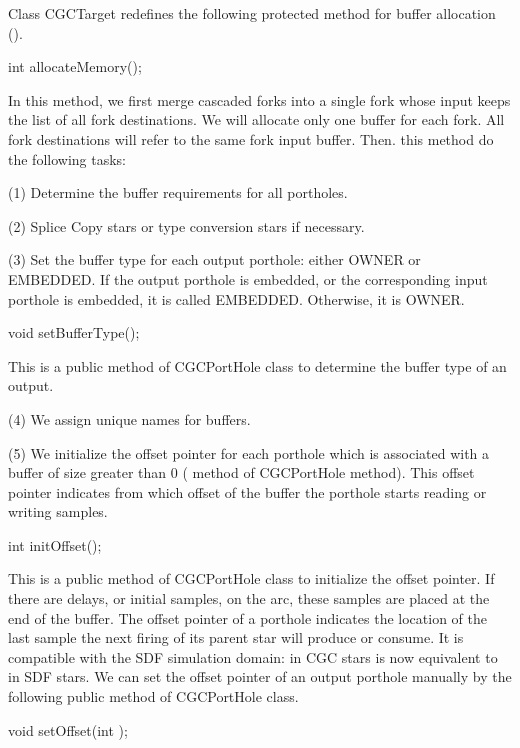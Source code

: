 Class CGCTarget redefines the
following protected method for buffer allocation ().

\begin{example}
int allocateMemory();
\end{example}

In this method, we first merge cascaded forks into a single fork whose
input keeps the list of all fork destinations. We will allocate only one
buffer for each fork. All fork destinations will refer to the same
fork input buffer. Then. this method do the following tasks:

(1) Determine the buffer requirements for all portholes.

(2) Splice Copy stars or type conversion stars if necessary.

(3) Set the buffer type for each output porthole: either OWNER or EMBEDDED.
If the output porthole is embedded, or the corresponding input porthole is
embedded, it is called EMBEDDED. Otherwise, it is OWNER.

\begin{example}
void setBufferType();
\end{example}

This is a public method of CGCPortHole class to determine the buffer type of
an output.

(4) We assign unique names for buffers.

(5) We initialize the offset pointer for each porthole which is associated
with a buffer of size greater than 0 ( method of CGCPortHole
method). This offset pointer indicates from which offset of the buffer the
porthole starts reading or writing samples.

\begin{example}
int initOffset();
\end{example}

This is a public method of CGCPortHole class to initialize the offset pointer.
If there are delays, or initial samples, on the arc, these samples are placed
at the end of the buffer. The offset pointer of a
porthole indicates the location of the last sample the next firing of its
parent star will produce or consume. It is compatible with the SDF simulation
domain:  in CGC stars is now
equivalent to  in SDF stars. 
We can set the offset pointer of an output porthole manually by the following
public method of CGCPortHole class. 

\begin{example}
void setOffset(int );
\end{example}
 

